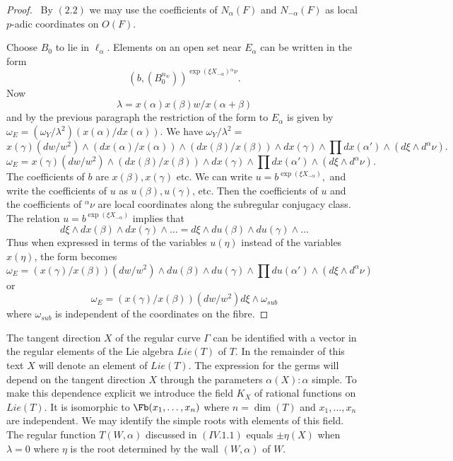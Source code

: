 \documentclass{memo-l}
\theoremstyle{definition}
\theoremstyle{remark}
\numberwithin{section}{chapter}
\numberwithin{equation}{chapter}
\begin{document}
\begin{proof} \ By $(2.2)$ we may use the coefficients of
$N_{{\alpha}}(F)$ and $N_{-{\alpha}}(F)$ as local $p$-adic coordinates on
$O(F)$.

   Choose $B_{0}$ to lie in ${\ell}_{{\alpha}}$.  Elements on an open set
near $E_{{\alpha}}$ can be written in the form
$$(b,(B_{0}^{n_w}))^{\exp(\xi X_{-\alpha}){{}^\alpha\nu}}.$$   Now
$$
{\lambda}  =  x({\alpha})x({\beta})w/x({\alpha}+{\beta})
$$
and by the previous paragraph the restriction of the form to $E_{{\alpha}}$
is given by ${\omega}_{E}  =
({\omega}_{Y}/{\lambda}^{2})(x({\alpha})/dx({\alpha}))$.  We have
${\omega}_{Y}/{\lambda}^{2}  = $
$$
x({\gamma})(dw/w^{2})\wedge (dx({\alpha})/x({\alpha}))\wedge
(dx({\beta})/x({\beta}))\wedge dx({\gamma})\wedge \prod
dx({\alpha}')\wedge (d{\xi}\wedge d^{{\alpha}}{\nu}).
$$
$$
{\omega}_{E}  =  x({\gamma})(dw/w^{2})\wedge (dx({\beta})/x({\beta}))\wedge
dx({\gamma})\wedge \prod dx({\alpha}')\wedge (d{\xi}\wedge d^{{\alpha}}{\nu}).
$$
The coefficients of $b$ are $x({\beta}), x({\gamma})$ etc.  We can write $u
 =  b^{\exp({\xi}X_{-{\alpha}})},$ and write the coefficients of $u$ as
$u({\beta}), u({\gamma})$, etc.  Then the coefficients of $u$ and the
coefficients of $^{{\alpha}}{\nu}$ are local coordinates along the
subregular conjugacy class.  The relation $u = b^{\exp({\xi}X_{-{\alpha}})}$
implies that
$$
d{\xi}\wedge dx({\beta})\wedge dx({\gamma})\wedge \ldots =  d{\xi}\wedge
du({\beta})\wedge du({\gamma})\wedge \ldots
$$
Thus when expressed in terms of the variables $u({\eta})$ instead of the
variables $x({\eta})$, the form becomes
$$
{\omega}_{E}  =  (x({\gamma})/x({\beta}))(dw/w^{2})\wedge du({\beta})\wedge
du({\gamma})\wedge \prod du({\alpha}')\wedge (d{\xi}\wedge d^{{\alpha}}{\nu})
$$
or
$$
{\omega}_{E}  =  (x({\gamma})/x({\beta}))(dw/w^{2})d{\xi}\wedge {\omega}_{sub}
$$
where ${\omega}_{sub}$ is independent of the coordinates on the fibre.
\end{proof}


{\medskip}

   The tangent direction $X$ of the regular curve ${\Gamma}$ can be
identified with a vector in the regular elements of the Lie algebra
$Lie(T)$ of $T$.  In the remainder of this text  $X$ will denote an
element of $Lie(T)$.  The expression for the germs will depend on the
tangent direction $X$ through the parameters ${\alpha}(X) : {\alpha}$
simple.  To make this dependence explicit we introduce the
field $K_X$ of rational functions on $Lie(T)$.
It is isomorphic to $\Fb (x_{1},\ldots
,x_{n})$ where $n  =  \dim(T)$ and $x_{1},\ldots ,x_{n}$ are independent.
We may identify the simple roots with elements of this
field.  The regular function $T(W,{\alpha})$ discussed in $(IV.1.1)$ equals
${\pm}{\eta}(X)$ when ${\lambda} = 0$ where ${\eta}$ is the root
determined by the wall $(W,{\alpha})$ of $W$.
\end{document}
